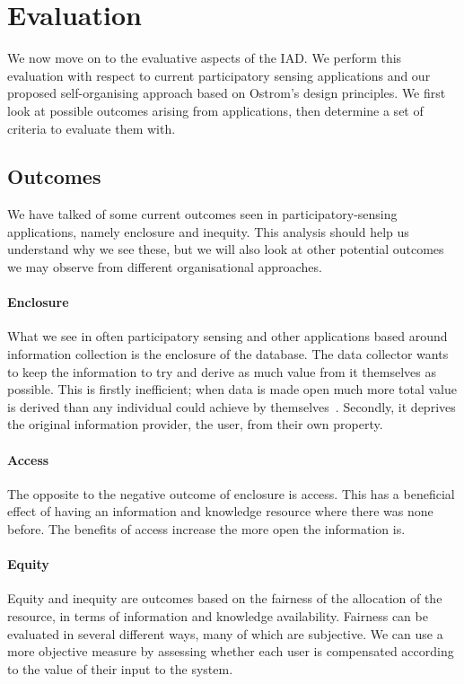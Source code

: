 \section{Evaluation}

We now move on to the evaluative aspects of the \ac{IAD}. We perform this evaluation with respect to current participatory sensing applications and our proposed self-organising approach based on Ostrom's design principles. We first look at possible outcomes arising from applications, then determine a set of criteria to evaluate them with.

\subsection{Outcomes}

We have talked of some current outcomes seen in participatory-sensing applications, namely enclosure and inequity. 
This analysis should help us understand why we see these, but we will also look at other potential outcomes we may observe from different organisational approaches. 

\paragraph{Enclosure}
What we see in often participatory sensing and other applications based around information collection is the enclosure of the database. 
The data collector wants to keep the information to try and derive as much value from it themselves as possible. 
This is firstly inefficient; when data is made open much more total value is derived than any individual could achieve by themselves~\citep{Shadbolt2012}. 
Secondly, it deprives the original information provider, the user, from their own property. 

\paragraph{Access}
The opposite to the negative outcome of enclosure is access. 
This has a beneficial effect of having an information and knowledge resource where there was none before. 
The benefits of access increase the more open the information is.

\paragraph{Equity}
Equity and inequity are outcomes based on the fairness of the allocation of the resource, in terms of information and knowledge availability. Fairness can be evaluated in several different ways, many of which are subjective. We can use a more objective measure by assessing whether each user is compensated according to the value of their input to the system. 

